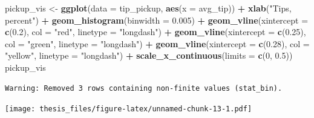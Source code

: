 \documentclass[12pt,twoside]{reedthesis}
\newenvironment{Shaded}{\begin{snugshade}}{\end{snugshade}}
\newcommand{\KeywordTok}[1]{\textcolor[rgb]{0.13,0.29,0.53}{\textbf{#1}}}
\newcommand{\DataTypeTok}[1]{\textcolor[rgb]{0.13,0.29,0.53}{#1}}
\newcommand{\DecValTok}[1]{\textcolor[rgb]{0.00,0.00,0.81}{#1}}
\newcommand{\FloatTok}[1]{\textcolor[rgb]{0.00,0.00,0.81}{#1}}
\newcommand{\StringTok}[1]{\textcolor[rgb]{0.31,0.60,0.02}{#1}}
\newcommand{\CommentTok}[1]{\textcolor[rgb]{0.56,0.35,0.01}{\textit{#1}}}
\newcommand{\OperatorTok}[1]{\textcolor[rgb]{0.81,0.36,0.00}{\textbf{#1}}}
\newcommand{\NormalTok}[1]{#1}
\theoremstyle{definition}
\theoremstyle{definition}
\theoremstyle{definition}
\theoremstyle{remark}
\begin{document}
\begin{Shaded}
\begin{Highlighting}[]
\NormalTok{pickup_vis <-}\StringTok{ }\KeywordTok{ggplot}\NormalTok{(}\DataTypeTok{data =}\NormalTok{ tip_pickup, }\KeywordTok{aes}\NormalTok{(}\DataTypeTok{x =}\NormalTok{ avg_tip)) }\OperatorTok{+}\StringTok{ }\KeywordTok{xlab}\NormalTok{(}\StringTok{"Tips, percent"}\NormalTok{) }\OperatorTok{+}\StringTok{ }
\StringTok{    }\KeywordTok{geom_histogram}\NormalTok{(}\DataTypeTok{binwidth =} \FloatTok{0.005}\NormalTok{) }\OperatorTok{+}\StringTok{ }\KeywordTok{geom_vline}\NormalTok{(}\DataTypeTok{xintercept =} \KeywordTok{c}\NormalTok{(}\FloatTok{0.2}\NormalTok{), }
    \DataTypeTok{col =} \StringTok{"red"}\NormalTok{, }\DataTypeTok{linetype =} \StringTok{"longdash"}\NormalTok{) }\OperatorTok{+}\StringTok{ }\KeywordTok{geom_vline}\NormalTok{(}\DataTypeTok{xintercept =} \KeywordTok{c}\NormalTok{(}\FloatTok{0.25}\NormalTok{), }
    \DataTypeTok{col =} \StringTok{"green"}\NormalTok{, }\DataTypeTok{linetype =} \StringTok{"longdash"}\NormalTok{) }\OperatorTok{+}\StringTok{ }\KeywordTok{geom_vline}\NormalTok{(}\DataTypeTok{xintercept =} \KeywordTok{c}\NormalTok{(}\FloatTok{0.28}\NormalTok{), }
    \DataTypeTok{col =} \StringTok{"yellow"}\NormalTok{, }\DataTypeTok{linetype =} \StringTok{"longdash"}\NormalTok{) }\OperatorTok{+}\StringTok{ }\KeywordTok{scale_x_continuous}\NormalTok{(}\DataTypeTok{limits =} \KeywordTok{c}\NormalTok{(}\DecValTok{0}\NormalTok{, }
    \FloatTok{0.5}\NormalTok{))}
\NormalTok{pickup_vis}
\end{Highlighting}
\end{Shaded}
\begin{verbatim}
Warning: Removed 3 rows containing non-finite values (stat_bin).
\end{verbatim}
\texttt{[image: thesis\_files/figure-latex/unnamed-chunk-13-1.pdf]}
\begin{Shaded}
\end{Shaded}
\end{document}
